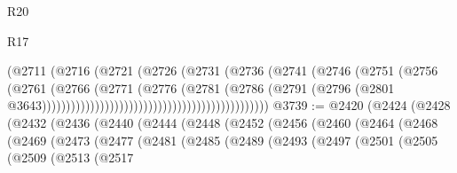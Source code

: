 \begin{lexlean}{R20}
\begin{lexlean}{R17}
\begin{coremodule}
{{{{{{{{{{{{{{{{{{{{{{{{{{{{{{{{{{{{{{{{{{{{{{{{{{{{{{{{{{{{{{{{{{{{{{{{{{{{{{{{{{{{{{{{{{{{{{{{{{{{{{{{{{{                                                            (@2711
                                                              (@2716
                                                                (@2721
                                                                  (@2726
                                                                    (@2731
                                                                      (@2736
                                                                        (@2741
                                                                          (@2746
                                                                            (@2751
                                                                              (@2756
                                                                                (@2761
                                                                                  (@2766
                                                                                    (@2771
                                                                                      (@2776
                                                                                        (@2781
                                                                                          (@2786
                                                                                            (@2791
                                                                                              (@2796
                                                                                                (@2801
                                                                                                  @3643)))))))))))))))))))))))))))))))))))))))))))))))
@3739 := @2420
    (@2424
      (@2428
        (@2432
          (@2436
            (@2440
              (@2444
                (@2448
                  (@2452
                    (@2456
                      (@2460
                        (@2464
                          (@2468
                            (@2469
                              (@2473
                                (@2477
                                  (@2481
                                    (@2485
                                      (@2489
                                        (@2493
                                          (@2497
                                            (@2501
                                              (@2505
                                                (@2509
                                                  (@2513
                                                    (@2517
}}}}}}}}}}}}}}}}}}}}}}}}}}}}}}}}}}}}}}}}}}}}}}}}}}}}}}}}}}}}}}}}}}}}}}}}}}}}}}}}}}}}}}}}}}}}}}}}}}}}}}}}}}}
\end{coremodule}
\end{lexlean}
\end{lexlean}
